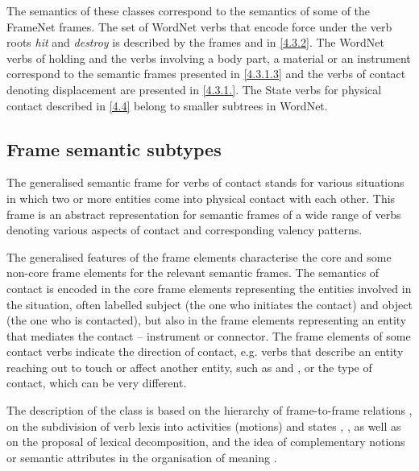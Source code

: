 \documentclass[output=paper,colorlinks,citecolor=brown]{langscibook}
\begin{document}
The semantics of these classes correspond to the semantics of some of the FrameNet frames. The set of WordNet verbs that encode force under the verb roots \textit{hit} and \textit{destroy} is described by the frames  and  in \ref{4.3.2}. The WordNet verbs of holding and the verbs involving a body part, a material or an instrument correspond to the semantic frames presented in \ref{4.3.1.3} and the verbs of contact denoting displacement are presented in \ref{4.3.1.}. The State verbs for physical contact described in \ref{4.4} belong to smaller subtrees in WordNet.

\subsection{Frame semantic subtypes} 

The generalised semantic frame for verbs of contact stands for various situations in which two or more entities come into physical contact with each other. This frame is an abstract representation for semantic frames of a wide range of verbs denoting various aspects of contact and corresponding valency patterns.

The generalised features of the frame elements characterise the core and some non-core frame elements for the relevant semantic frames. The semantics of contact is encoded in the core frame elements representing the entities involved in the situation, often labelled subject (the one who initiates the contact) and object (the one who is contacted), but also in the frame elements representing an entity that mediates the contact -- instrument or connector. The frame elements of some contact verbs indicate the direction of contact, e.g. verbs that describe an entity reaching out to touch or affect another entity, such as  and , or the type of contact, which can be very different.

The description of the class is based on the hierarchy of frame-to-frame relations \citep{Ruppenhofer2016}, on the subdivision of verb lexis into activities (motions) and states \citep[100]{Vendler1957},  \citet[40]{Dowty1979}, as well as on the proposal of lexical decomposition, and the idea of complementary notions or semantic attributes in the organisation of meaning \citep{Lobner2011}. 
\end{document}
